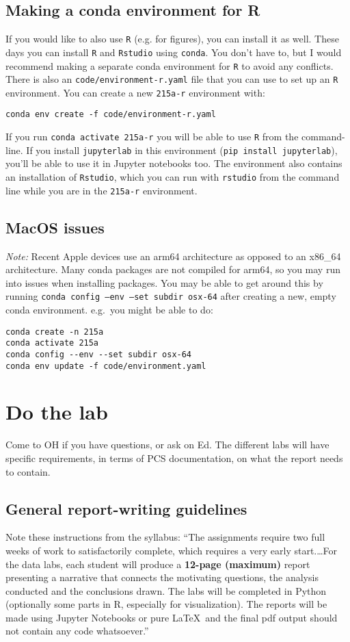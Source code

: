 \documentclass[letterpaper,12pt]{article}
\begin{document}
\subsection{Making a conda environment for R}
If you would like to also use \texttt{R} (e.g. for figures), you can install it as well. These days you can install \texttt{R} and \texttt{Rstudio} using \texttt{conda}. You don't have to, but I would recommend making a separate conda environment for \texttt{R} to avoid any conflicts. There is also an \texttt{code/environment-r.yaml} file that you can use to set up an \texttt{R} environment. You can create a new \texttt{215a-r} environment with:
\begin{verbatim}
conda env create -f code/environment-r.yaml
\end{verbatim}
If you run \texttt{conda activate 215a-r} you will be able to use \texttt{R} from the command-line. If you install \texttt{jupyterlab} in this environment (\texttt{pip install jupyterlab}), you'll be able to use it in Jupyter notebooks too. The environment also contains an installation of \texttt{Rstudio}, which you can run with \texttt{rstudio} from the command line while you are in the \texttt{215a-r} environment.

\subsection{MacOS issues}
\textit{Note:} Recent Apple devices use an arm64 architecture as opposed to an x86\_64 architecture. Many conda packages are not compiled for arm64, so you may run into issues when installing packages. You may be able to get around this by running \texttt{conda config --env --set subdir osx-64} after creating a new, empty conda environment. e.g.~you might be able to do:
\begin{verbatim}
conda create -n 215a
conda activate 215a
conda config --env --set subdir osx-64
conda env update -f code/environment.yaml
\end{verbatim}

\section{Do the lab}
Come to OH if you have questions, or ask on Ed. The different labs will have specific requirements, in terms of PCS documentation, on what the report needs to contain.

\subsection{General report-writing guidelines}
Note these instructions from the syllabus:
``The assignments require two full weeks of work to satisfactorily complete, which requires a very early start.\ldots For the data labs, each student will produce a \textbf{12-page (maximum)} report presenting a narrative that connects the motivating
questions, the analysis conducted and the conclusions drawn. The labs will be completed in Python
(optionally some parts in R, especially for visualization). The reports will be made using Jupyter
Notebooks or pure \LaTeX\ and the final pdf output should not contain any code whatsoever.''
\end{document}

